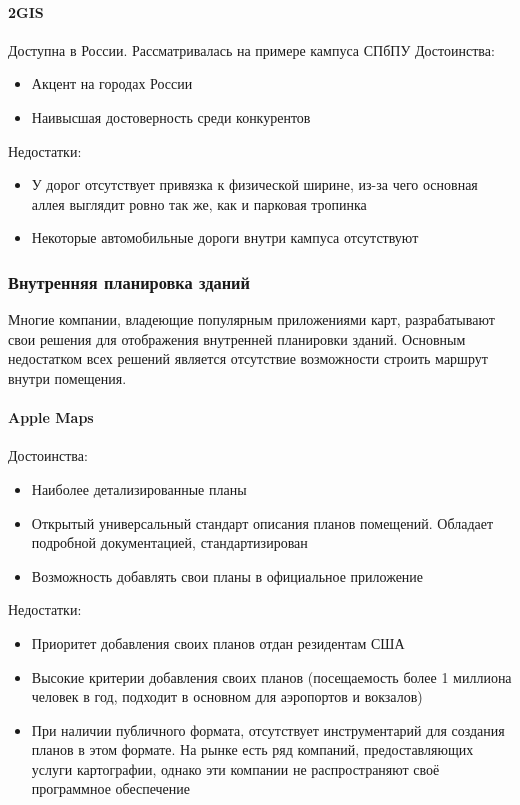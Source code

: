
      \paragraph{2GIS}
        Доступна в России. Рассматривалась на примере кампуса СПбПУ
        \noindent Достоинства:
        \begin{itemize}
          \item Акцент на городах России
          \item Наивысшая достоверность среди конкурентов
        \end{itemize}

        \noindent Недостатки:
        \begin{itemize}
          \item У дорог отсутствует привязка к физической ширине, из-за чего основная аллея выглядит ровно так же, как и парковая тропинка
          \item Некоторые автомобильные дороги внутри кампуса отсутствуют
        \end{itemize}




    \subsubsection{Внутренняя планировка зданий}
      Многие компании, владеющие популярным приложениями карт, разрабатывают свои решения для отображения внутренней планировки зданий. Основным недостатком всех решений является отсутствие возможности строить маршрут внутри помещения.
      \paragraph{Apple Maps}
        \noindent Достоинства:
        \begin{itemize}
          \item Наиболее детализированные планы
          \item Открытый универсальный стандарт описания планов помещений. Обладает подробной документацией, стандартизирован \cite{IMDFOGC}
          \item Возможность добавлять свои планы в официальное приложение
        \end{itemize}

        \noindent Недостатки:
        \begin{itemize}
          \item Приоритет добавления своих планов отдан резидентам США
          \item Высокие критерии добавления своих планов (посещаемость более 1 миллиона человек в год, подходит в основном для аэропортов и вокзалов)
          \item При наличии публичного формата, отсутствует инструментарий для создания планов в этом формате. На рынке есть ряд компаний, предоставляющих услуги картографии, однако эти компании не распространяют своё программное обеспечение
        \end{itemize}

